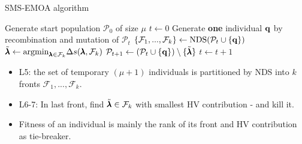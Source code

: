 \begin{frame}[allowframebreaks]{SMS-EMOA algorithm}
\begin{algorithm}[H]
  \begin{center}
  \caption{SMS-EMOA}
    \begin{algorithmic}[1]
    \STATE Generate start population $\mathcal{P}_0$ of size $\mu$
    \STATE $t \leftarrow 0$
      \REPEAT
        \STATE Generate \textbf{one} individual $\mathbf{q}$ by recombination and mutation of $\mathcal{P}_t$ 
        \STATE $\{\mathcal{F}_{1},..., \mathcal{F}_k\} \leftarrow \text{NDS}(\mathcal{P}_{t}\cup \{\mathbf{q}\})$
        \STATE $\tilde{\pmb{\lambda}} \leftarrow \text{argmin}_{\pmb{\lambda} \in \mathcal{F}_{k}}\Delta s(\pmb{\lambda}, \mathcal{F}_{k})$
        \STATE $\mathcal{P}_{t+1} \leftarrow (\mathcal{P}_t \cup \{\mathbf{q}\}) \setminus\{\tilde{\pmb{\lambda}}\}$
        \STATE $ t \leftarrow t+1$
    \vspace*{-0.3cm}
    \end{algorithmic}
    \end{center}
\end{algorithm}
    \vspace{-0.5cm}
\begin{itemize}
\item L5: the set of temporary $(\mu + 1)$ individuals is partitioned by NDS into $k$ fronts $\mathcal{F}_{1},...,\mathcal{F}_{k}$. 
\item L6-7: In last front, find $\tilde{\pmb{\lambda}} \in \mathcal{F}_{k}$ with smallest HV contribution - and kill it.
\item Fitness of an individual is mainly the rank of its front and HV contribution as tie-breaker.
\end{itemize}
\end{frame}


